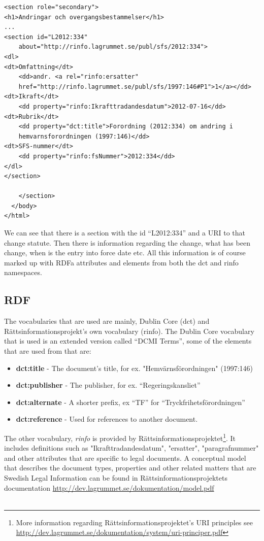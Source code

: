 \begin{verbatim}
<section role="secondary">
<h1>Andringar och overgangsbestammelser</h1>
...
<section id="L2012:334" 
    about="http://rinfo.lagrummet.se/publ/sfs/2012:334">
<dl>
<dt>Omfattning</dt>
    <dd>andr. <a rel="rinfo:ersatter"
    href="http://rinfo.lagrummet.se/publ/sfs/1997:146#P1">1</a></dd>
<dt>Ikraft</dt>
    <dd property="rinfo:Ikrafttradandesdatum">2012-07-16</dd>
<dt>Rubrik</dt>
    <dd property="dct:title">Forordning (2012:334) om andring i 
    hemvarnsforordningen (1997:146)</dd>
<dt>SFS-nummer</dt>
    <dd property="rinfo:fsNummer">2012:334</dd>
</dl>
</section>

    </section>
  </body>
</html>
\end{verbatim}
\linebreak
\newline
We can see that there is a section with the id “L2012:334” and a URI to that change statute. Then there is information regarding the change, what has been change, when is the entry into force date etc. All this information is of course marked up with RDFa attributes and elements from both the dct and rinfo namespaces. 
 
\subsection{RDF}
The vocabularies that are used are mainly, Dublin Core (dct) and Rättsinformationsprojekt's own vocabulary (rinfo). The Dublin Core vocabulary that is used is an extended version called “DCMI Terms”, some of the elements that are used from that are:\\ 
\begin{itemize}
\item \textbf{dct:title} - The document's title, for ex. "Hemvärnsförordningen" (1997:146)
\item \textbf{dct:publisher} - The publisher, for ex. “Regeringskansliet”
\item \textbf{dct:alternate} - A shorter prefix, ex “TF” for “Tryckfrihetsförordningen”
\item \textbf{dct:reference} - Used for references to another document. 
\end{itemize}
The other vocabulary, \textit{rinfo} is provided by Rättsinformationsprojektet\footnote{More information regarding Rättsinformationsprojektet's URI principles see \url{http://dev.lagrummet.se/dokumentation/system/uri-principer.pdf}}. It includes definitions such as "Ikrafttradandesdatum", "ersatter", "paragrafnummer" and other attributes that are specific to legal documents. A conceptual model that describes the document types, properties and other related matters that are Swedish Legal Information can be found in Rättsinformationsprojektets documentation \url{http://dev.lagrummet.se/dokumentation/model.pdf}\\\\

